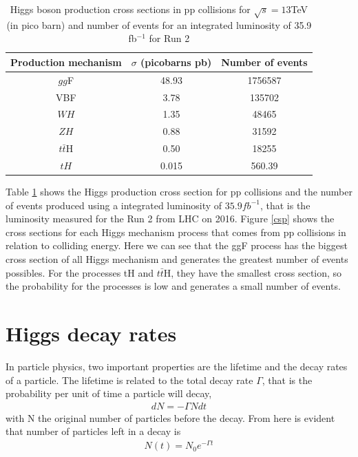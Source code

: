 \begin{table}[ht]
\centering
\caption[Higgs boson production cross sections in pp collisions number of events for  35.9 fb$^{-1}$ ]{	Higgs boson production cross sections in pp collisions for $\sqrt{s}=13$TeV (in pico barn) and number of events for an integrated luminosity of 35.9 fb$^{-1}$ for Run 2  \cite{pd}}
\begin{tabular}{|c|c|c|}
\hline
Production mechanism &
$\sigma$ (picobarns pb) & Number of events \\
\hline
$gg$F & 48.93 & 1756587\\
\hline
VBF & 3.78 & 135702\\
\hline
$WH$ & 1.35 & 48465\\
\hline
$ZH$ &0.88 & 31592\\
\hline
$t\bar{t}$H & 0.50 & 18255\\
\hline
$tH$	& 0.015 & 560.39\\
\hline
\end{tabular}
\label{crt}
\end{table}

 Table \ref{crt} shows the Higgs production cross section for pp collisions and the number of events produced using a integrated luminosity of $35.9 fb^{-1}$, that is the luminosity measured for the Run 2 from LHC on 2016\cite{pd}. Figure \ref{csp} shows the cross sections for each Higgs mechanism process  that comes from pp collisions in relation to colliding energy.
Here we can see that the ggF process has the biggest cross section of all Higgs mechanism and generates the greatest number of events possibles. For the processes tH and $t\bar{t}$H, they have the smallest cross section, so the probability for the processes is low and generates a small number of events. 

\section{Higgs decay rates}
In particle physics, two important properties are the lifetime and the decay rates of a particle. The lifetime is related to the total decay rate $\Gamma$, that is the probability per unit of time a particle will decay, 
\begin{align}
  dN=-\Gamma N dt
\end{align}
with N the original number of particles before the decay. From here is evident that number of particles left in a decay is 
\begin{align}
N(t)=N_0 e^{-\Gamma t}
\end{align}

